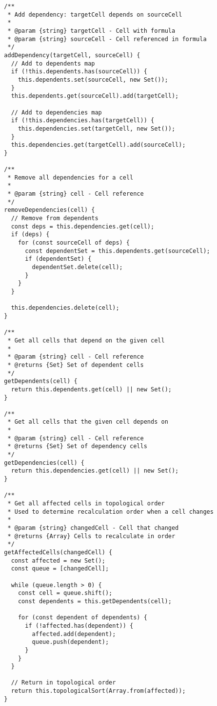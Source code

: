 \documentclass[11pt]{article}
\begin{document}
\begin{verbatim}
  /**
   * Add dependency: targetCell depends on sourceCell
   * 
   * @param {string} targetCell - Cell with formula
   * @param {string} sourceCell - Cell referenced in formula
   */
  addDependency(targetCell, sourceCell) {
    // Add to dependents map
    if (!this.dependents.has(sourceCell)) {
      this.dependents.set(sourceCell, new Set());
    }
    this.dependents.get(sourceCell).add(targetCell);
    
    // Add to dependencies map
    if (!this.dependencies.has(targetCell)) {
      this.dependencies.set(targetCell, new Set());
    }
    this.dependencies.get(targetCell).add(sourceCell);
  }
  
  /**
   * Remove all dependencies for a cell
   * 
   * @param {string} cell - Cell reference
   */
  removeDependencies(cell) {
    // Remove from dependents
    const deps = this.dependencies.get(cell);
    if (deps) {
      for (const sourceCell of deps) {
        const dependentSet = this.dependents.get(sourceCell);
        if (dependentSet) {
          dependentSet.delete(cell);
        }
      }
    }
    
    this.dependencies.delete(cell);
  }
  
  /**
   * Get all cells that depend on the given cell
   * 
   * @param {string} cell - Cell reference
   * @returns {Set} Set of dependent cells
   */
  getDependents(cell) {
    return this.dependents.get(cell) || new Set();
  }
  
  /**
   * Get all cells that the given cell depends on
   * 
   * @param {string} cell - Cell reference
   * @returns {Set} Set of dependency cells
   */
  getDependencies(cell) {
    return this.dependencies.get(cell) || new Set();
  }
  
  /**
   * Get all affected cells in topological order
   * Used to determine recalculation order when a cell changes
   * 
   * @param {string} changedCell - Cell that changed
   * @returns {Array} Cells to recalculate in order
   */
  getAffectedCells(changedCell) {
    const affected = new Set();
    const queue = [changedCell];
    
    while (queue.length > 0) {
      const cell = queue.shift();
      const dependents = this.getDependents(cell);
      
      for (const dependent of dependents) {
        if (!affected.has(dependent)) {
          affected.add(dependent);
          queue.push(dependent);
        }
      }
    }
    
    // Return in topological order
    return this.topologicalSort(Array.from(affected));
  }
  

\end{verbatim}
\end{document}
